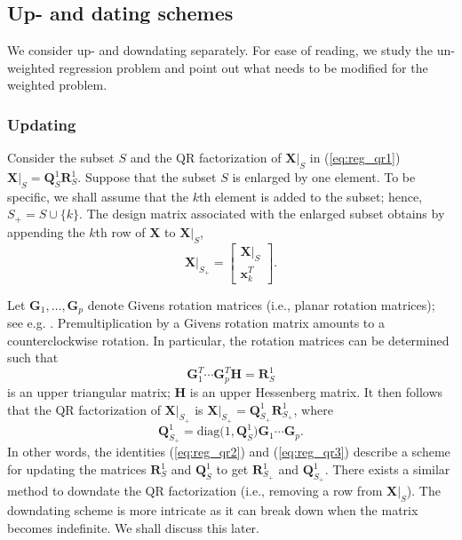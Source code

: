 \documentclass[a4paper,oneside,11pt,DIV=12]{scrartcl}
\begin{document}
\subsection{Up- and dating schemes}
We consider up- and downdating separately. For ease of reading, we study
the un-weighted regression problem and point out what needs to be modified
for the weighted problem.

\subsubsection{Updating}

Consider the subset $S$ and the QR factorization of $\bm X \vert_S$ in
(\ref{eq:reg_qr1}) $\bm X \vert_S = \bm Q_S^1 \bm R_S^1$. Suppose that the
subset $S$ is enlarged by one element. To be specific, we shall assume
that the $k$th element is added to the subset; hence, $S_{+} = S \cup \{k\}$.
The design matrix associated with the enlarged subset obtains by
appending the $k$th row of $\bm X$ to $\bm X \vert_S$,
\begin{equation*}
	\bm X\vert_{S_+} = \left[\begin{matrix}
		\bm X\vert_{S} \\ \bm x_k^T
	\end{matrix}\right].
\end{equation*}

Let $\bm G_1, \ldots, \bm G_p$ denote Givens rotation matrices (i.e.,
planar rotation matrices); see e.g. \citet[][Chap. 5.1.8]{golub_loan_1996}.
Premultiplication by a Givens rotation matrix amounts to a
counterclockwise rotation. In particular, the rotation matrices can
be determined such that
\begin{equation}\label{eq:reg_qr2}
	\bm G_1^T \cdots \bm G_p^T \bm H = \bm R_{S}^1
\end{equation}
\noindent is an upper triangular matrix; $\bm H$ is an upper Hessenberg
matrix. It then follows that \citep[][Chap. 12.5.3]{golub_loan_1996} the
QR factorization of $\bm X\vert_{S_+}$ is
$\bm X\vert_{S_+} = \bm Q_{S_+}^1 \bm R_{S_+}^1$, where
\begin{equation}\label{eq:reg_qr3}
	\bm Q_{S_+}^1 = \mathrm{diag}\big(1, \bm Q_{S}^1\big) \bm G_1 \cdots
		\bm G_p.
\end{equation}
\noindent In other words, the identities (\ref{eq:reg_qr2}) and
(\ref{eq:reg_qr3}) describe a scheme for updating the matrices $\bm R_S^1$
and $\bm Q_S^1$ to get $\bm R_{S_+}^1$ and $\bm Q_{S_+}^1$. There exists
a similar method to downdate the QR factorization (i.e., removing a row
from $\bm X \vert_S$). The downdating scheme is more intricate as it can
break down when the matrix becomes indefinite. We shall discuss this later.
\end{document}

